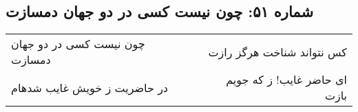 \begin{center}
\section*{شماره ۵۱: چون نیست کسی در دو جهان دمسازت}
\label{sec:051}
\begin{longtable}{l p{0.5cm} r}
چون نیست کسی در دو جهان دمسازت
&&
کس نتواند شناخت هرگز رازت
\\
در حاضریت ز خویش غایب شدهام
&&
ای حاضر غایب! ز که جویم بازت
\\
\end{longtable}
\end{center}
